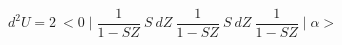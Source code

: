 \begin{equation}
d^{2}U = 2~<0\mid  \frac{1}{1-SZ}~ S~dZ~\frac{1}{1-SZ}~S~dZ~\frac{1}{1-SZ}\mid \alpha>
\end{equation}

